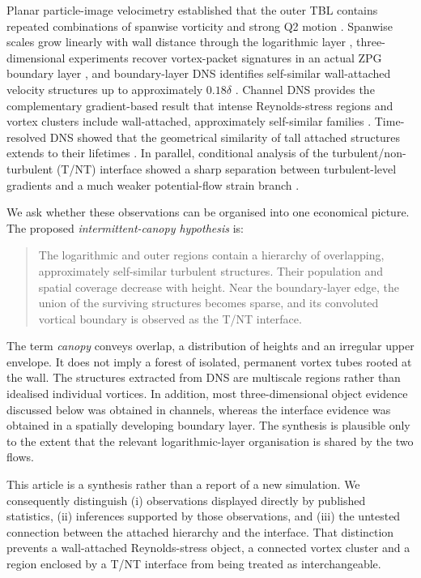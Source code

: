 \documentclass[11pt]{article}
\begin{document}
Planar particle-image velocimetry established that the outer TBL contains repeated combinations of spanwise vorticity and strong Q2 motion \citep{AdrianEtAl2000}. Spanwise scales grow linearly with wall distance through the logarithmic layer \citep{TomkinsAdrian2003}, three-dimensional experiments recover vortex-packet signatures in an actual ZPG boundary layer \citep{DennisNickels2011}, and boundary-layer DNS identifies self-similar wall-attached velocity structures up to approximately $0.18\delta$ \citep{HwangSung2018}. Channel DNS provides the complementary gradient-based result that intense Reynolds-stress regions and vortex clusters include wall-attached, approximately self-similar families \citep{DelAlamoEtAl2006,LozanoDuranEtAl2012}.  Time-resolved DNS showed that the geometrical similarity of tall attached structures extends to their lifetimes \citep{LozanoDuranJimenez2014}.  In parallel, conditional analysis of the turbulent/non-turbulent (T/NT) interface showed a sharp separation between turbulent-level gradients and a much weaker potential-flow strain branch \citep{BorrellJimenez2016}.

We ask whether these observations can be organised into one economical picture.  The proposed \emph{intermittent-canopy hypothesis} is:

\begin{quote}
The logarithmic and outer regions contain a hierarchy of overlapping, approximately self-similar turbulent structures. Their population and spatial coverage decrease with height. Near the boundary-layer edge, the union of the surviving structures becomes sparse, and its convoluted vortical boundary is observed as the T/NT interface.
\end{quote}

The term \emph{canopy} conveys overlap, a distribution of heights and an irregular upper envelope.  It does not imply a forest of isolated, permanent vortex tubes rooted at the wall.  The structures extracted from DNS are multiscale regions rather than idealised individual vortices.  In addition, most three-dimensional object evidence discussed below was obtained in channels, whereas the interface evidence was obtained in a spatially developing boundary layer.  The synthesis is plausible only to the extent that the relevant logarithmic-layer organisation is shared by the two flows.

This article is a synthesis rather than a report of a new simulation.  We consequently distinguish (i) observations displayed directly by published statistics, (ii) inferences supported by those observations, and (iii) the untested connection between the attached hierarchy and the interface.  That distinction prevents a wall-attached Reynolds-stress object, a connected vortex cluster and a region enclosed by a T/NT interface from being treated as interchangeable.
\end{document}
